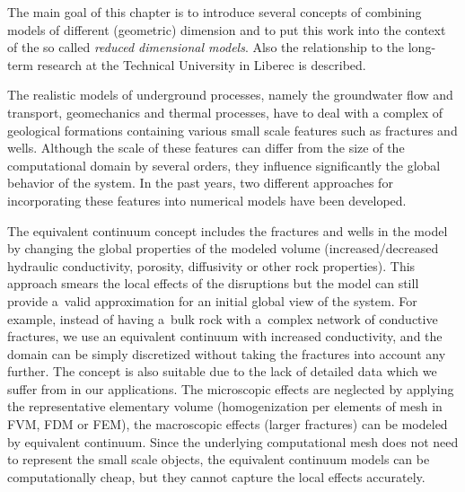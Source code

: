 The main goal of this chapter is to introduce several concepts of combining models of different (geometric) dimension and 
to put this work into the context of the so called \emph{reduced dimensional models}.
Also the relationship to the long-term research at the Technical University in Liberec is described.%

The realistic models of underground processes, namely the groundwater flow and transport, geomechanics and thermal processes, have to deal with 
a complex of geological formations containing various small scale features such as fractures and wells. Although the scale of these features
can differ from the size of the computational domain by several orders, they influence significantly the global behavior of the system.
In the past years, two different approaches for incorporating these features into numerical models have been developed.


The equivalent continuum concept includes the fractures and wells in the model by changing the global properties of the modeled volume
(increased/decreased hydraulic conductivity, porosity, diffusivity or other rock properties).
This approach smears the local effects of the disruptions but the model can still provide a~valid approximation for an initial global view of the system.
For example, instead of having a~bulk rock with a~complex network of conductive fractures, we use an equivalent continuum with increased conductivity,
and the domain can be simply discretized without taking the fractures into account any further.
The concept is also suitable due to the lack of detailed data which we suffer from in our applications.
The microscopic effects are neglected by applying the representative elementary volume (homogenization per elements of mesh in FVM, FDM or FEM),
the macroscopic effects (larger fractures) can be modeled by equivalent continuum.
Since the underlying computational mesh does not need to represent the small scale objects, the equivalent continuum models can be computationally cheap,
but they cannot capture the local effects accurately.


